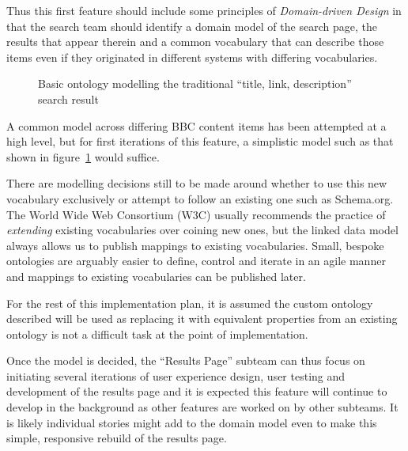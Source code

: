 Thus this first feature should include some principles of
\emph{Domain-driven Design}\cite{evans2004domain}
in that the search team should identify
a domain model of the search page, the results that appear therein
and a common vocabulary that can describe those items even if
they originated in different systems with differing vocabularies.

\begin{figure}
  \begin{center}
  \end{center}
  \caption{Basic ontology modelling the traditional ``title, link, description'' search result\label{fig:initial-ontology}}
\end{figure}

A common model across differing BBC content items has been
attempted\cite{fenning2014applicability} at a high level, but
for first iterations of this feature, a simplistic model
such as that shown in figure~\ref{fig:initial-ontology}
would suffice.

There are modelling decisions still to be
made around whether to use this new vocabulary exclusively
or attempt to follow an existing one such as Schema.org. The
World Wide Web Consortium (W3C) usually recommends the practice
of \emph{extending} existing vocabularies over coining new
ones, but the linked data model always allows us to publish
mappings to existing vocabularies. Small, bespoke
ontologies are arguably easier to define, control and iterate
in an agile manner and mappings to existing vocabularies
can be published later.

For the rest of this implementation plan, it is assumed
the custom ontology described will be used as replacing it
with equivalent properties from an existing ontology
is not a difficult task at the point of implementation.

Once the model is decided,
the ``Results Page'' subteam can thus focus on initiating
several iterations of user experience design, user testing
and development of the results page and it is expected this
feature will continue to develop in the background as
other features are worked on by other subteams. It is likely
individual stories might add to the domain model even
to make this simple, responsive rebuild of the results page.

